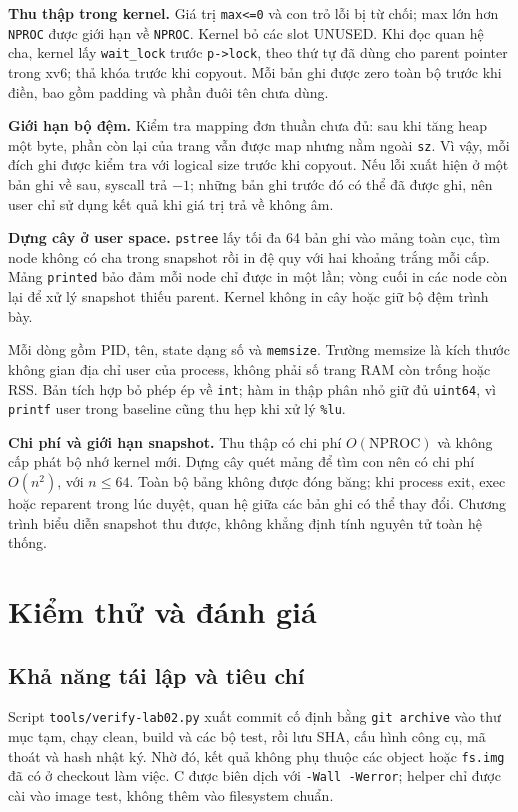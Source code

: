 \documentclass[12pt,a4paper]{article}
\newcommand{\code}[1]{\texttt{#1}}
\begin{document}
\textbf{Thu thập trong kernel.} Giá trị \code{max<=0} và con trỏ lỗi bị từ chối; max lớn hơn \code{NPROC} được giới hạn về \code{NPROC}. Kernel bỏ các slot UNUSED. Khi đọc quan hệ cha, kernel lấy \code{wait\_lock} trước \code{p->lock}, theo thứ tự đã dùng cho parent pointer trong xv6; thả khóa trước khi copyout. Mỗi bản ghi được zero toàn bộ trước khi điền, bao gồm padding và phần đuôi tên chưa dùng.

\textbf{Giới hạn bộ đệm.} Kiểm tra mapping đơn thuần chưa đủ: sau khi tăng heap một byte, phần còn lại của trang vẫn được map nhưng nằm ngoài \code{sz}. Vì vậy, mỗi đích ghi được kiểm tra với logical size trước khi copyout. Nếu lỗi xuất hiện ở một bản ghi về sau, syscall trả $-1$; những bản ghi trước đó có thể đã được ghi, nên user chỉ sử dụng kết quả khi giá trị trả về không âm.

\textbf{Dựng cây ở user space.} \code{pstree} lấy tối đa 64 bản ghi vào mảng toàn cục, tìm node không có cha trong snapshot rồi in đệ quy với hai khoảng trắng mỗi cấp. Mảng \code{printed} bảo đảm mỗi node chỉ được in một lần; vòng cuối in các node còn lại để xử lý snapshot thiếu parent. Kernel không in cây hoặc giữ bộ đệm trình bày.

Mỗi dòng gồm PID, tên, state dạng số và \code{memsize}. Trường memsize là kích thước không gian địa chỉ user của process, không phải số trang RAM còn trống hoặc RSS. Bản tích hợp bỏ phép ép về \code{int}; hàm in thập phân nhỏ giữ đủ \code{uint64}, vì \code{printf} user trong baseline cũng thu hẹp khi xử lý \code{\%lu}.

\textbf{Chi phí và giới hạn snapshot.} Thu thập có chi phí $O(\mathrm{NPROC})$ và không cấp phát bộ nhớ kernel mới. Dựng cây quét mảng để tìm con nên có chi phí $O(n^2)$, với $n\le64$. Toàn bộ bảng không được đóng băng; khi process exit, exec hoặc reparent trong lúc duyệt, quan hệ giữa các bản ghi có thể thay đổi. Chương trình biểu diễn snapshot thu được, không khẳng định tính nguyên tử toàn hệ thống.

\clearpage
\section{Kiểm thử và đánh giá}\label{sec:testing}
\subsection{Khả năng tái lập và tiêu chí}
Script \code{tools/verify-lab02.py} xuất commit cố định bằng \code{git archive} vào thư mục tạm, chạy clean, build và các bộ test, rồi lưu SHA, cấu hình công cụ, mã thoát và hash nhật ký. Nhờ đó, kết quả không phụ thuộc các object hoặc \code{fs.img} đã có ở checkout làm việc. C được biên dịch với \code{-Wall -Werror}; helper chỉ được cài vào image test, không thêm vào filesystem chuẩn.
\end{document}
